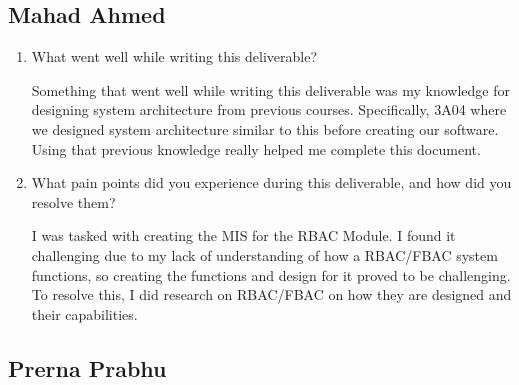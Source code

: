 \documentclass[12pt, titlepage]{article}
\begin{document}


\subsection{Mahad Ahmed}

\begin{enumerate}
    \item What went well while writing this deliverable? 

    Something that went well while writing this deliverable was my knowledge for designing system architecture from previous courses. Specifically, 3A04 where we designed system architecture similar to this before creating our software. Using that previous knowledge really helped me complete this document.
    
    \item What pain points did you experience during this deliverable, and how
    did you resolve them?

    I was tasked with creating the MIS for the RBAC Module. I found it challenging due to my lack of understanding of how a RBAC/FBAC system functions, so creating the functions and design for it proved to be challenging. To resolve this, I did research on RBAC/FBAC on how they are designed and their capabilities.
    
\end{enumerate}

\subsection{Prerna Prabhu}
\end{document}
